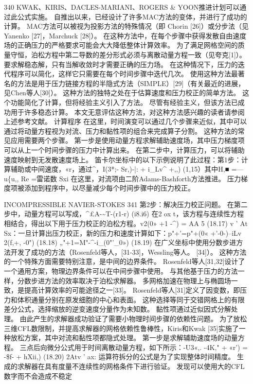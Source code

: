 \documentclass[UTF8,11pt,a4paper,openany,fontset=fandol]{ctexbook}
\begin{document}
340 KWAK、KIRIS、DACLES-MARIANI、ROGERS \& YOON推进计划可以通过此公式实施。 自推出以来，已经设计了许多MAC方法的变体，并进行了成功的计算。 MAC方法可以被视为投影方法的特殊情况（即 Chorin [26]）或分步法（见Yanenko [27]，Marchuck [28]）。 在这种方法中，在每个步骤中获得发散自由速度场的正确压力的严格要求可能会大大降低整体计算效率。 为了满足网格空间的质量守恒，泊松方程中第二导数的差分形式必须与离散动量方程一致（见夸克[1]）。 要求解稳态解，只有当解收敛时才需要正确的压力场。 在这种情况下，压力的迭代程序可以简化，这样它只需要在每个时间步骤中迭代几次。 使用这种方法最著名的方法是用于压力链接方程的半隐式方法（SIMPLE）[29]（有关最近的进展，见Chen等人[30]）。 这种方法的独特之处在于估算速度和压力校正的简单方法。 这个功能简化了计算，但将经验主义引入了方法。 尽管有经验主义，但该方法已成功用于许多稳态计算。 本文无意评估这种方法，对这种方法感兴趣的读者请参阅上述参考文献。 计算程序 在这里，时间演变可以通过几个步骤来近似，其中可以通过将动量方程视为对流、压力和黏性项的组合来完成算子分割。 这种方法的常见应用需要两个步骤。 第一步是使用动量方程求解辅助速度场，其中压力梯度项可以从上一个时间步骤的压力中计算出来。 在第二步中，计算压力，可以将辅助速度映射到无发散速度场上。 笛卡尔坐标中的以下示例说明了此过程：第1步：计算辅助或中间速度，«r，通过\textasciicircum{}，I(3*;- Sr,)-|: + i\_Lv\textasciicircum{} +,,) (1,15）其中H,■ =---u\{u,, Re =雷诺数 Sxi 在这里，对流项由二阶Adams-Bashforth方法推进。 压力梯度项被添加到程序中，以尽量减少每个时间步骤中的压力校正。

INCOMPRESSIBLE NAVIER-STOKES 341 第2步：解决压力校正问题。 在第二步中，动量方程可以写成，\textasciicircum{}£A-\textasciitilde{}T-(r1-r) (i8.i6) 在2 ox t，该方程与连续性方程相结合，得出以下用于压力校正的泊松方程。v2(0» +1 -\textasciicircum{}) = AA 5 (18.17) v ' At Sx：一旦计算出压力校正，新的压力和速度计算如下：p"+'=p"+(0« +'-0-)--iLv 2(f,+, -0") (18.18) „"+1=M"-\textasciicircum{}-i\_(0"'\_0») (18.19) 在广义坐标中使用分数步进方法开发了成功的方法（Rosenfeld等人，[31-33]，Wessling等人。 [34]）。 这种方法的一个特殊方面需要特别注意，是中间的边界条件。 Rosenfeld等人[31,32]设计了一个通用方案，物理边界条件可以在中间步骤中使用。 与其他基于压力的方法一样，分数步进方法的效率取决于泊松求解器。 多网格加速在物理上与椭圆场一致，是提高计算效率的可能途径之一[33]。 Rosenfeld等人[31]定义了因变数，即压力和体积通量分别在原发细胞的中心和表面。 这种选择等同于交错网格上的有限差分公式，选择缩放的逆变速度分量作为未知数。 黏性项通过近似因式分解处理。 由此产生的求解器成功验证了需要小物理时间步骤的依赖性问题。 为了放松三维CFL数限制，并提高求解器的网格依赖性鲁棒性，Kiris和Kwak [35]实施了一种放松方案，其中对流和黏性项都隐式处理。 第一步是求解辅助速度场的动量方程。 三点后向微分公式用于时间离散动量方程，如下所示：-U3«,. -4K," + «r') = -\$f- + hXii,) (18.20) 2Atv ' ax: 运算符拆分的公式是为了实现整体时间精度。 生成的求解器在具有度量不连续性的网格条件下进行验证。 发现可以使用大的CFL数字而不会造成不稳定
\end{document}
